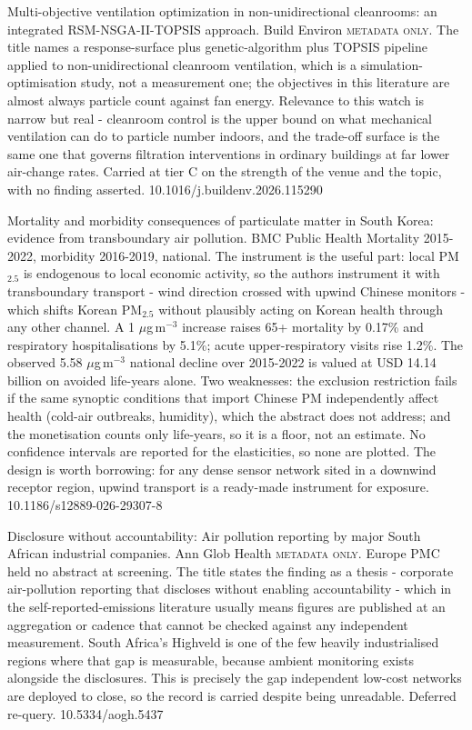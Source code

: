 \documentclass[10pt]{article}
\begin{document}
{Multi-objective ventilation optimization in non-unidirectional cleanrooms: an integrated RSM-NSGA-II-TOPSIS approach.}
{Build Environ}
{\textsc{metadata only.} The title names a response-surface plus genetic-algorithm plus TOPSIS pipeline applied to non-unidirectional cleanroom ventilation, which is a simulation-optimisation study, not a measurement one; the objectives in this literature are almost always particle count against fan energy. Relevance to this watch is narrow but real - cleanroom control is the upper bound on what mechanical ventilation can do to particle number indoors, and the trade-off surface is the same one that governs filtration interventions in ordinary buildings at far lower air-change rates. Carried at tier C on the strength of the venue and the topic, with no finding asserted.}
{10.1016/j.buildenv.2026.115290}


{Mortality and morbidity consequences of particulate matter in South Korea: evidence from transboundary air pollution.}
{BMC Public Health}
{Mortality 2015-2022, morbidity 2016-2019, national. The instrument is the useful part: local PM$_{2.5}$ is endogenous to local economic activity, so the authors instrument it with transboundary transport - wind direction crossed with upwind Chinese monitors - which shifts Korean PM$_{2.5}$ without plausibly acting on Korean health through any other channel. A 1 $\mu$g\,m$^{-3}$ increase raises 65+ mortality by 0.17\% and respiratory hospitalisations by 5.1\%; acute upper-respiratory visits rise 1.2\%. The observed 5.58 $\mu$g\,m$^{-3}$ national decline over 2015-2022 is valued at USD 14.14 billion on avoided life-years alone. Two weaknesses: the exclusion restriction fails if the same synoptic conditions that import Chinese PM independently affect health (cold-air outbreaks, humidity), which the abstract does not address; and the monetisation counts only life-years, so it is a floor, not an estimate. No confidence intervals are reported for the elasticities, so none are plotted. The design is worth borrowing: for any dense sensor network sited in a downwind receptor region, upwind transport is a ready-made instrument for exposure.}
{10.1186/s12889-026-29307-8}

{Disclosure without accountability: Air pollution reporting by major South African industrial companies.}
{Ann Glob Health}
{\textsc{metadata only.} Europe PMC held no abstract at screening. The title states the finding as a thesis - corporate air-pollution reporting that discloses without enabling accountability - which in the self-reported-emissions literature usually means figures are published at an aggregation or cadence that cannot be checked against any independent measurement. South Africa's Highveld is one of the few heavily industrialised regions where that gap is measurable, because ambient monitoring exists alongside the disclosures. This is precisely the gap independent low-cost networks are deployed to close, so the record is carried despite being unreadable. Deferred re-query.}
{10.5334/aogh.5437}
\end{document}
